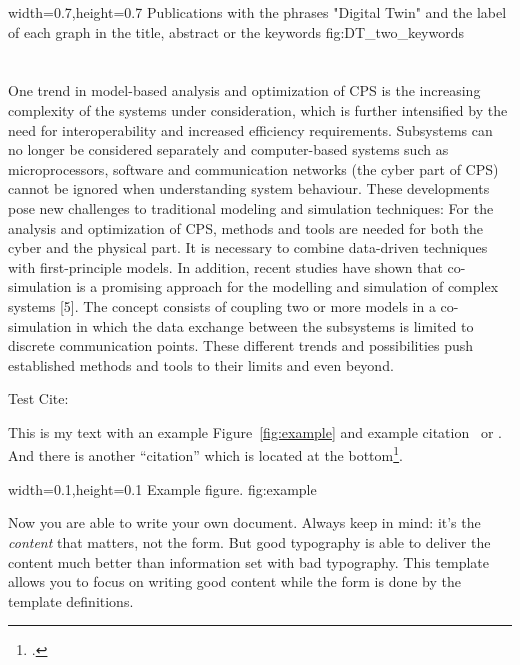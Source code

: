   {width=0.7\textwidth,height=0.7\textheight}%
  {Publications with the phrases "Digital Twin" and the label of each graph in the title, abstract or the keywords  }%
  {}%
  {fig:DT_two_keywords}%
  
 


  
\section{}
One trend in model-based analysis and optimization of CPS is the increasing complexity of the systems under consideration, which is further intensified by the need for interoperability and increased efficiency requirements. Subsystems can no longer be considered separately and computer-based systems such as microprocessors, software and communication networks (the cyber part of CPS) cannot be ignored when understanding system behaviour. These developments pose new challenges to traditional modeling and simulation techniques: For the analysis and optimization of CPS, methods and tools are needed for both the cyber and the physical part.  It is necessary to combine data-driven techniques with first-principle models. In addition, recent studies have shown that co-simulation is a promising approach for the modelling and simulation of complex systems [5]. The concept consists of coupling two or more models in a co-simulation in which the data exchange between the subsystems is limited to discrete communication points. These different trends and possibilities push established methods and tools to their limits and even beyond. 

 
Test Cite:~\cite{eigner2019definition}




This is my text with an example Figure~\ref{fig:example} and example
citation~\cite{StrunkWhite} or \textcite{Bringhurst1993}. And there is another
\enquote{citation} which is located at the bottom\footcite{tagstore}.

  {width=0.1\textwidth,height=0.1\textheight}%
  {Example figure.}%
  {}%
  {fig:example}%

Now you are able to write your own document. Always keep in mind: it's
the \emph{content} that matters, not the form. But good typography is
able to deliver the content much better than information set with bad
typography. This template allows you to focus on writing good content
while the form is done by the template definitions.


